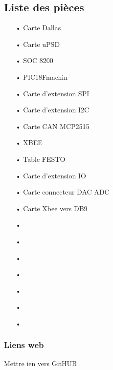 \documentclass[10pt,a4paper,final]{article}
\begin{document}
\begin{spacing}{1.5}
\subsection{Liste des pièces}
\begin{center}
\HRule
\end{center}
\begin{multicols}{3}
\begin{itemize}
\item[•]Carte Dallas
\item[•]Carte uPSD
\item[•]SOC 8200
\item[•]PIC18Fmachin
\item[•]Carte d'extension SPI
\item[•]Carte d'extension I2C
\item[•]Carte CAN MCP2515
\item[•]XBEE
\item[•]Table FESTO
\item[•]Carte d'extension IO
\item[•]Carte connecteur DAC ADC
\item[•]Carte Xbee vers DB9
\item[•]
\item[•]
\item[•]
\item[•]
\item[•]
\item[•]
\item[•]
\end{itemize}
\end{multicols}
\begin{center}
\HRule
\end{center}

\subsubsection{Liens web}
Mettre ien vers GitHUB


\end{spacing}
\end{document}
